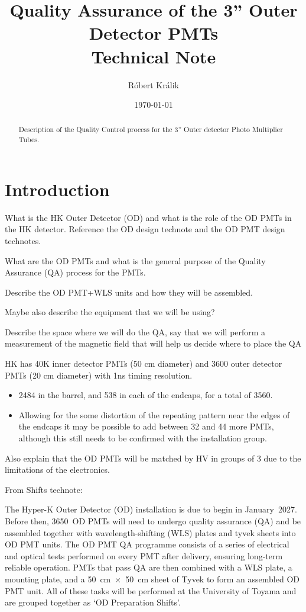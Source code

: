 \documentclass[12pt,a4paper]{article}
\author[1]{Róbert Králik}
\affil[1]{King's College London, UK}
\title{\textbf{Quality Assurance of the 3'' Outer Detector PMTs\\ \vspace*{5mm}
\Large{Technical Note}}}
\date{\today}
\begin{document}
\maketitle
\thispagestyle{empty} %
\begin{abstract}
Description of the Quality Control process for the 3'' Outer detector Photo Multiplier Tubes.
\end{abstract}
\newpage

\thispagestyle{empty} %
\tableofcontents
\newpage
{} %

\section{Introduction}

What is the HK Outer Detector (OD) and what is the role of the OD PMTs in the HK detector. Reference the OD design technote and the OD PMT design technotes.

What are the OD PMTs and what is the general purpose of the Quality Assurance (QA) process for the PMTs.

Describe the OD PMT+WLS units and how they will be assembled.

Maybe also describe the equipment that we will be using?

Describe the space where we will do the QA, say that we will perform a measurement of the magnetic field that will help us decide where to place the QA

HK has 40K inner detector PMTs (50 cm diameter) and 3600 outer detector PMTs (20 cm diameter) with 1ns timing resolution.
\begin{itemize}
  \item 2484 in the barrel, and 538 in each of the endcaps, for a total of 3560.
  \item Allowing for the some distortion of the repeating pattern near the edges of the endcaps it may be possible to add between 32 and 44 more PMTs, although this still needs to be confirmed with the installation group. 
\end{itemize}

Also explain that the OD PMTs will be matched by HV in groups of 3 due to the limitations of the electronics.

From Shifts technote:

The Hyper-K Outer Detector (OD) installation is due to begin in January~2027. Before then, 3650~OD PMTs will need to undergo quality assurance (QA) and be assembled together with wavelength-shifting (WLS) plates and tyvek sheets into OD PMT units. The OD PMT QA programme consists of a series of electrical and optical tests performed on every PMT after delivery, ensuring long-term reliable operation. PMTs that pass QA are then combined with a WLS plate, a mounting plate, and a 50~cm~$\times$~50~cm sheet of Tyvek to form an assembled OD PMT unit. All of these tasks will be performed at the University of Toyama and are grouped together as `OD Preparation Shifts'.
\end{document}
